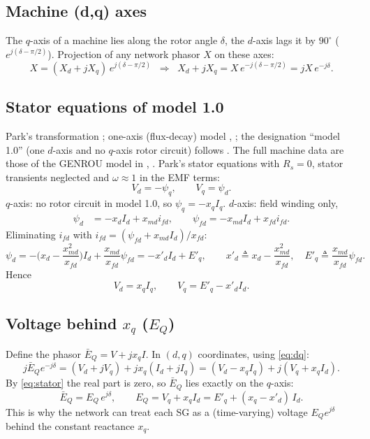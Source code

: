 \documentclass[11pt,a4paper]{article}
\numberwithin{equation}{section}
\begin{document}
\subsection{Machine (d,q) axes}\label{sec:dq}
The $q$-axis of a machine lies along the rotor angle $\delta$, the $d$-axis lags it by $90^\circ$ ($e^{j(\delta-\pi/2)}$). Projection of any network phasor $X$ on these axes:
\begin{equation}
X = (X_d + jX_q)\,e^{j(\delta-\pi/2)}
\;\;\Longrightarrow\;\;
X_d + jX_q = X\,e^{-j(\delta-\pi/2)} = jX\,e^{-j\delta}.
\label{eq:dq}
\end{equation}

\subsection{Stator equations of model 1.0}\label{sec:stator}
Park's transformation \cite{Park1929}; one-axis (flux-decay) model \cite{SauerPai1998}, \cite{Kundur1994}; the designation ``model 1.0'' (one $d$-axis and no $q$-axis rotor circuit) follows \cite{IEEE1110}. The full machine data are those of the GENROU model in \cite{RA2021access}, \cite{Pourbeik2016}.
Park's stator equations with $R_s=0$, stator transients neglected and $\omega\approx 1$ in the EMF terms:
\begin{equation}
V_d = -\psi_q,\qquad V_q = \psi_d .
\end{equation}
$q$-axis: no rotor circuit in model 1.0, so $\psi_q = -x_q I_q$. $d$-axis: field winding only,
\begin{align}
\psi_d &= -x_d I_d + x_{md} i_{fd},\qquad \psi_{fd} = -x_{md} I_d + x_{fd} i_{fd} .
\end{align}
Eliminating $i_{fd}$ with $i_{fd} = (\psi_{fd} + x_{md}I_d)/x_{fd}$:
\begin{equation}
\psi_d = -\Big(x_d - \frac{x_{md}^2}{x_{fd}}\Big)I_d + \frac{x_{md}}{x_{fd}}\psi_{fd}
= -x'_d I_d + E'_q,
\qquad x'_d \triangleq x_d - \frac{x_{md}^2}{x_{fd}},\quad E'_q \triangleq \frac{x_{md}}{x_{fd}}\psi_{fd}.
\end{equation}
Hence
\begin{equation}
\boxed{V_d = x_q I_q,\qquad V_q = E'_q - x'_d I_d .}
\label{eq:stator}
\end{equation}

\subsection{Voltage behind $x_q$ ($E_Q$)}
Define the phasor $\bar E_Q = V + jx_q I$. In $(d,q)$ coordinates, using \eqref{eq:dq}:
\begin{equation}
j\bar E_Q e^{-j\delta} = (V_d + jV_q) + jx_q(I_d + jI_q) = (V_d - x_qI_q) + j(V_q + x_qI_d).
\end{equation}
By \eqref{eq:stator} the real part is zero, so $\bar E_Q$ lies exactly on the $q$-axis:
\begin{equation}
\boxed{\bar E_Q = E_Q\,e^{j\delta},\qquad E_Q = V_q + x_qI_d = E'_q + (x_q - x'_d)\,I_d .}
\label{eq:EQ}
\end{equation}
This is why the network can treat each SG as a (time-varying) voltage $E_Q e^{j\delta}$ behind the constant reactance $x_q$.
\end{document}
